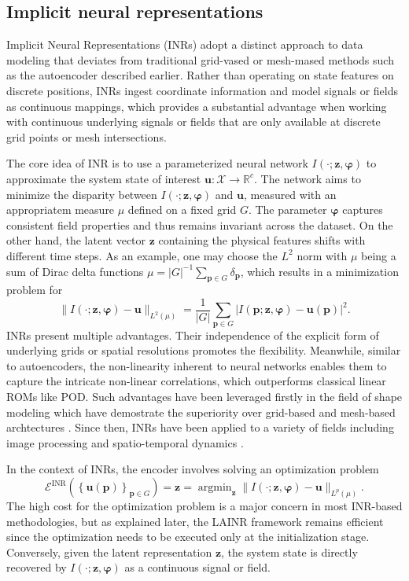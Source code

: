 \documentclass{article}
\newcommand{\mR}{\mathbb{R}}
\newcommand{\mX}{\mathcal{X}}
\newcommand{\mE}{\mathcal{E}}
\DeclareMathOperator*{\argmin}{argmin}
\begin{document}
\subsection{Implicit neural representations}
Implicit Neural Representations (INRs) adopt a distinct approach to data modeling that deviates from traditional grid-vased or mesh-mased methods such as the autoencoder described earlier. Rather than operating on state features on discrete positions, INRs ingest coordinate information and model signals or fields as continuous mappings, which provides a substantial advantage when working with continuous underlying signals or fields that are only available at discrete grid points or mesh intersections.

The core idea of INR is to use a parameterized neural network $I(\cdot;\bm z,\bm\varphi)$ to approximate the system state of interest $\bm u:\mX\to\mR^c$. The network aims to minimize the disparity between $I(\cdot;\bm z,\bm\varphi)$ and $\bm u$, measured with an appropriatem measure $\mu$ defined on a fixed grid $G$. The parameter $\bm\varphi$ captures consistent field properties and thus remains invariant across the dataset. On the other hand, the latent vector $\bm z$ containing the physical features shifts with different time steps. As an example, one may choose the $L^2$ norm with $\mu$ being a sum of Dirac delta functions $\mu=|G|^{-1}\sum_{\bm p\in G}\delta_{\bm p}$, which results in a minimization problem for
\[\|I(\cdot;\bm z,\bm\varphi)-\bm u\|_{L^2(\mu)}=\frac{1}{|G|}\sum_{\bm p\in G}|I(\bm p;\bm z,\bm\varphi)-\bm u(\bm p)|^2.\]
INRs present multiple advantages. Their independence of the explicit form of underlying grids or spatial resolutions promotes the flexibility. Meanwhile, similar to autoencoders, the non-linearity inherent to neural networks enables them to capture the intricate non-linear correlations, which outperforms classical linear ROMs like POD. Such advantages have been leveraged firstly in the field of shape modeling which have demostrate the superiority over grid-based and mesh-based archtectures \cite{chen2019learning,park2019deepsdf}. Since then, INRs have been applied to a variety of fields including image processing \cite{sitzmann2019siren,Bemana2020xfields,dupont2022coinpp} and spatio-temporal dynamics \cite{Jiang2020MeshfreeFlowNet,chen2023crom,yin2023dino}.

In the context of INRs, the encoder involves solving an optimization problem
\[\mE^{\textrm{INR}}\left(\left\{\bm u(\bm p)\right\}_{\bm p\in G}\right)=\bm z=\argmin_{\bm z}\|I(\cdot;\bm z,\bm\varphi)-\bm u\|_{L^p(\mu)}.\]
The high cost for the optimization problem is a major concern in most INR-based methodologies, but as explained later, the LAINR framework remains efficient since the optimization needs to be executed only at the initialization stage. Conversely, given the latent representation $\bm z$, the system state is directly recovered by $I(\cdot;\bm z,\bm\varphi)$ as a continuous signal or field.
\end{document}
